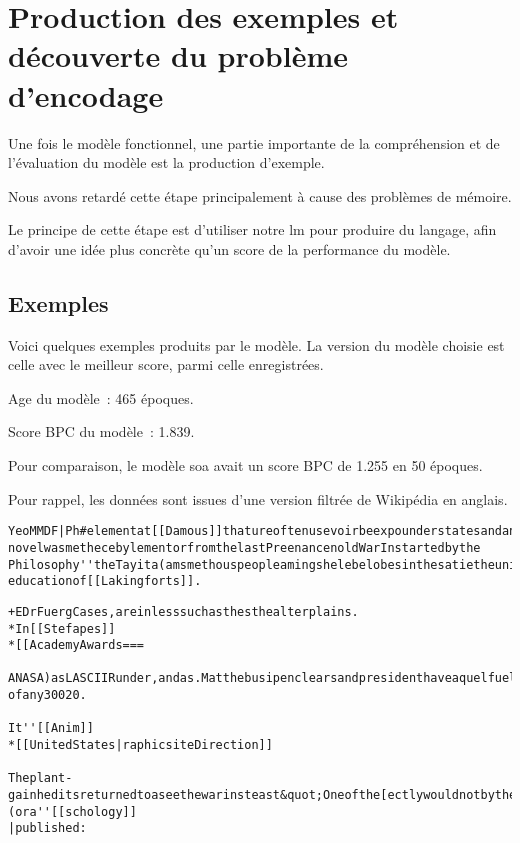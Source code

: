 \section{Production des exemples et découverte du problème d'encodage}
Une fois le modèle fonctionnel, une partie importante de la compréhension et de l'évaluation du modèle est la production d'exemple.

Nous avons retardé cette étape principalement à cause des problèmes de mémoire.

Le principe de cette étape est d'utiliser notre \gls{lm} pour produire du langage, afin d'avoir une idée plus concrète qu'un score de la performance du modèle.

\subsection{Exemples}
Voici quelques exemples produits par le modèle. 
La version du modèle choisie est celle avec le meilleur score, parmi celle enregistrées.

Age du modèle~: 465 époques.

Score BPC du modèle~: 1.839.

Pour comparaison, le modèle \gls{soa} avait un score BPC de 1.255 en 50 époques.

Pour rappel, les données sont issues d'une version filtrée de Wikipédia en anglais.

\begin{lstlisting}[caption={Exemple 1~: une suite de caractères à priori incompréhensibles.},label=gmsnn_ex1]
YeoMMDF|Ph#elementat[[Damous]]thatureoftenusevoirbeexpounderstatesandanumberofhisworkformembersothan novelwasmethecebylementorfromthelastPreenancenoldWarInstartedbythe Philosophy''theTayita(amsmethouspeopleamingshelebelobesinthesatietheuniversalistscientis educationof[[Lakingforts]].
\end{lstlisting}

\begin{lstlisting}[caption={[Exemple 2~: des termes balisé comme dans le corpus d'origine, les crochets ouverts sont refermés.]Exemple 2~: des termes balisé comme dans le corpus d'origine, les crochets ouverts sont refermés.},label=gmsnn_ex2]
+EDrFuergCases,areinlesssuchasthesthealterplains.
*In[[Stefapes]]
*[[AcademyAwards===

ANASA)asLASCIIRunder,andas.MatthebusipenclearsandpresidenthaveaquelfuelsifthesearchfromAwarerLievol ofany30020.

It''[[Anim]]
*[[UnitedStates|raphicsiteDirection]]

Theplant-gainheditsreturnedtoaseethewarinsteast&quot;Oneofthe[ectlywouldnotbytheIntegrationscapianland](ora''[[schology]]
|published:
\end{lstlisting}

